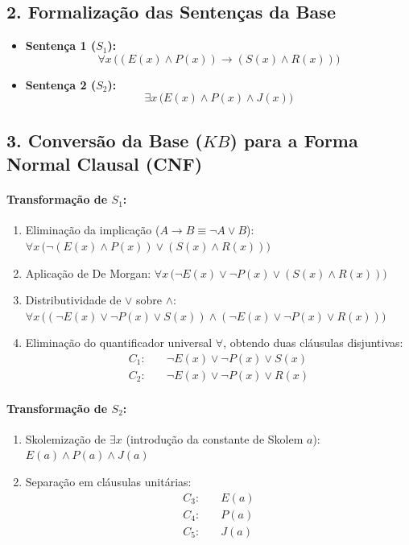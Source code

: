 \documentclass[11pt,a4paper]{article}
\begin{document}
\subsection*{2. Formalização das Sentenças da Base}

\begin{itemize}
    \item \textbf{Sentença 1 ($S_1$):}
    \[
    \forall x \, \Big( (E(x) \land P(x)) \to (S(x) \land R(x)) \Big)
    \]
    \item \textbf{Sentença 2 ($S_2$):}
    \[
    \exists x \, \Big( E(x) \land P(x) \land J(x) \Big)
    \]
\end{itemize}

\subsection*{3. Conversão da Base ($KB$) para a Forma Normal Clausal (CNF)}

\paragraph{Transformação de $S_1$:}
\begin{enumerate}[label=\alph*)]
    \item Eliminação da implicação ($A \to B \equiv \neg A \lor B$):
    $\forall x \, \big( \neg(E(x) \land P(x)) \lor (S(x) \land R(x)) \big)$
    \item Aplicação de De Morgan:
    $\forall x \, \big( \neg E(x) \lor \neg P(x) \lor (S(x) \land R(x)) \big)$
    \item Distributividade de $\lor$ sobre $\land$:
    $\forall x \, \big( (\neg E(x) \lor \neg P(x) \lor S(x)) \land (\neg E(x) \lor \neg P(x) \lor R(x)) \big)$
    \item Eliminação do quantificador universal $\forall$, obtendo duas cláusulas disjuntivas:
    \begin{align*}
        C_1: & \quad \neg E(x) \lor \neg P(x) \lor S(x) \\
        C_2: & \quad \neg E(x) \lor \neg P(x) \lor R(x)
    \end{align*}
\end{enumerate}

\paragraph{Transformação de $S_2$:}
\begin{enumerate}[label=\alph*)]
    \item Skolemização de $\exists x$ (introdução da constante de Skolem $a$):
    $E(a) \land P(a) \land J(a)$
    \item Separação em cláusulas unitárias:
    \begin{align*}
        C_3: & \quad E(a) \\
        C_4: & \quad P(a) \\
        C_5: & \quad J(a)
    \end{align*}
\end{enumerate}
\end{document}
